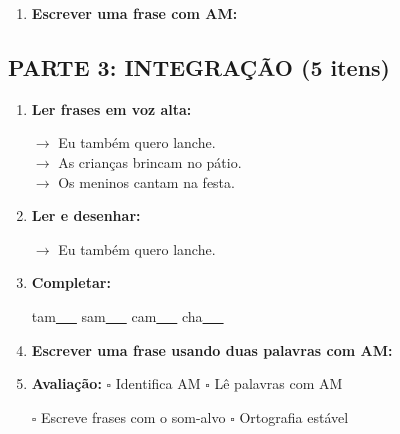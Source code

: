 \begin{exercicio}
\begin{enumerate}[resume]
  \item \textbf{Escrever uma frase com AM:}
  \begin{center}
  \underline{\hspace{12cm}}
  \end{center}

\end{enumerate}

\subsection*{PARTE 3: INTEGRAÇÃO (5 itens)}

\begin{enumerate}[resume]

  \item \textbf{Ler frases em voz alta:}
  \begin{center}
  $\rightarrow$ Eu também quero lanche.\\
  $\rightarrow$ As crianças brincam no pátio.\\
  $\rightarrow$ Os meninos cantam na festa.\\
  \end{center}

  \item \textbf{Ler e desenhar:}
  \begin{center}
  $\rightarrow$ Eu também quero lanche.
  \end{center}
  \begin{center}
  \end{center}

  \item \textbf{Completar:}
  \begin{center}
  tam\underline{~~~} \quad sam\underline{~~~} \quad cam\underline{~~~} \quad cha\underline{~~~}
  \end{center}

  \item \textbf{Escrever uma frase usando duas palavras com AM:}
  \begin{center}
  \underline{\hspace{12cm}}
  \end{center}

  \item \textbf{Avaliação:} $\square$ Identifica AM \quad $\square$ Lê palavras com AM
  \begin{center}
  $\square$ Escreve frases com o som-alvo \quad $\square$ Ortografia estável
  \end{center}


\end{enumerate}
\end{exercicio}
